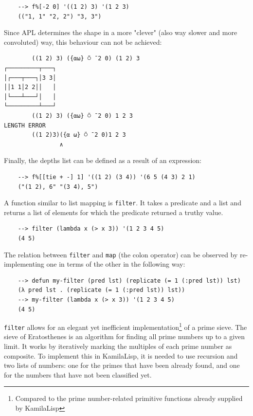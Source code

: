\begin{Verbatim}
    --> f%[-2 0] '((1 2) 3) '(1 2 3)
    (("1, 1" "2, 2") "3, 3")
\end{Verbatim}

Since APL determines the shape in a more "clever" (also way slower and more convoluted) way, this behaviour can not be achieved:

\begin{Verbatim}
        ((1 2) 3) ({⍺⍵} ⍥ ¯2 0) (1 2) 3
┌─────────┬───┐
│┌───┬───┐│3 3│
││1 1│2 2││   │
│└───┴───┘│   │
└─────────┴───┘
        ((1 2) 3) ({⍺⍵} ⍥ ¯2 0) 1 2 3
LENGTH ERROR
        ((1 2)3)({⍺ ⍵} ⍥ ¯2 0)1 2 3
                ∧
\end{Verbatim}

Finally, the depths list can be defined as a result of an expression:

\begin{Verbatim}
    --> f%[[tie + -] 1] '((1 2) (3 4)) '(6 5 (4 3) 2 1)
    ("(1 2), 6" "(3 4), 5")
\end{Verbatim}

A function similar to list mapping is \verb|filter|. It takes a predicate and a list and returns a list of elements for which the predicate returned a truthy value.

\begin{Verbatim}
    --> filter (lambda x (> x 3)) '(1 2 3 4 5)
    (4 5)
\end{Verbatim}

The relation between \verb|filter| and \verb|map| (the colon operator) can be observed by re-implementing one in terms of the other in the following way:

\begin{Verbatim}
    --> defun my-filter (pred lst) (replicate (= 1 (:pred lst)) lst)
    (λ pred lst . (replicate (= 1 (:pred lst)) lst))
    --> my-filter (lambda x (> x 3)) '(1 2 3 4 5)
    (4 5)
\end{Verbatim}

\verb|filter| allows for an elegant yet inefficient implementation\footnote{Compared to the prime number-related primitive functions already supplied by KamilaLisp} of a prime sieve. The sieve of Eratosthenes is an algorithm for finding all prime numbers up to a given limit. It works by iteratively marking the multiples of each prime number as composite. To implement this in KamilaLisp, it is needed to use recursion and two lists of numbers: one for the primes that have been already found, and one for the numbers that have not been classified yet.

